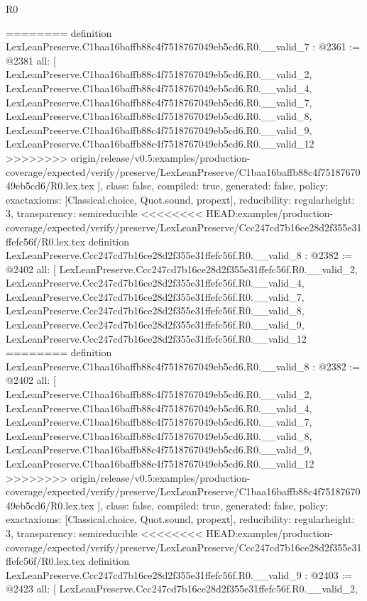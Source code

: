 \begin{lexlean}{R0}
\begin{coremodule}
{{{{{{{{{{{{{{{{{{{{{{{{{{{{{{{{{{{{{{{{{{{{{{========
definition LexLeanPreserve.C1baa16baffb88c4f7518767049eb5cd6.R0.__valid_7 : @2361 := @2381 {
  all: [
    LexLeanPreserve.C1baa16baffb88c4f7518767049eb5cd6.R0.__valid_2,
    LexLeanPreserve.C1baa16baffb88c4f7518767049eb5cd6.R0.__valid_4,
    LexLeanPreserve.C1baa16baffb88c4f7518767049eb5cd6.R0.__valid_7,
    LexLeanPreserve.C1baa16baffb88c4f7518767049eb5cd6.R0.__valid_8,
    LexLeanPreserve.C1baa16baffb88c4f7518767049eb5cd6.R0.__valid_9,
    LexLeanPreserve.C1baa16baffb88c4f7518767049eb5cd6.R0.__valid_12
>>>>>>>> origin/release/v0.5:examples/production-coverage/expected/verify/preserve/LexLeanPreserve/C1baa16baffb88c4f7518767049eb5cd6/R0.lex.tex
  ],
  class: false,
  compiled: true,
  generated: false,
  policy: exact{axioms: [Classical.choice, Quot.sound, propext]},
  reducibility: regular{height: 3},
  transparency: semireducible
}
<<<<<<<< HEAD:examples/production-coverage/expected/verify/preserve/LexLeanPreserve/Ccc247cd7b16ce28d2f355e31ffefc56f/R0.lex.tex
definition LexLeanPreserve.Ccc247cd7b16ce28d2f355e31ffefc56f.R0.__valid_8 : @2382 := @2402 {
  all: [
    LexLeanPreserve.Ccc247cd7b16ce28d2f355e31ffefc56f.R0.__valid_2,
    LexLeanPreserve.Ccc247cd7b16ce28d2f355e31ffefc56f.R0.__valid_4,
    LexLeanPreserve.Ccc247cd7b16ce28d2f355e31ffefc56f.R0.__valid_7,
    LexLeanPreserve.Ccc247cd7b16ce28d2f355e31ffefc56f.R0.__valid_8,
    LexLeanPreserve.Ccc247cd7b16ce28d2f355e31ffefc56f.R0.__valid_9,
    LexLeanPreserve.Ccc247cd7b16ce28d2f355e31ffefc56f.R0.__valid_12
========
definition LexLeanPreserve.C1baa16baffb88c4f7518767049eb5cd6.R0.__valid_8 : @2382 := @2402 {
  all: [
    LexLeanPreserve.C1baa16baffb88c4f7518767049eb5cd6.R0.__valid_2,
    LexLeanPreserve.C1baa16baffb88c4f7518767049eb5cd6.R0.__valid_4,
    LexLeanPreserve.C1baa16baffb88c4f7518767049eb5cd6.R0.__valid_7,
    LexLeanPreserve.C1baa16baffb88c4f7518767049eb5cd6.R0.__valid_8,
    LexLeanPreserve.C1baa16baffb88c4f7518767049eb5cd6.R0.__valid_9,
    LexLeanPreserve.C1baa16baffb88c4f7518767049eb5cd6.R0.__valid_12
>>>>>>>> origin/release/v0.5:examples/production-coverage/expected/verify/preserve/LexLeanPreserve/C1baa16baffb88c4f7518767049eb5cd6/R0.lex.tex
  ],
  class: false,
  compiled: true,
  generated: false,
  policy: exact{axioms: [Classical.choice, Quot.sound, propext]},
  reducibility: regular{height: 3},
  transparency: semireducible
}
<<<<<<<< HEAD:examples/production-coverage/expected/verify/preserve/LexLeanPreserve/Ccc247cd7b16ce28d2f355e31ffefc56f/R0.lex.tex
definition LexLeanPreserve.Ccc247cd7b16ce28d2f355e31ffefc56f.R0.__valid_9 : @2403 := @2423 {
  all: [
    LexLeanPreserve.Ccc247cd7b16ce28d2f355e31ffefc56f.R0.__valid_2,
}}}}}}}}}}}}}}}}}}}}}}}}}}}}}}}}}}}}}}}}}}}}}}}}
\end{coremodule}
\end{lexlean}

